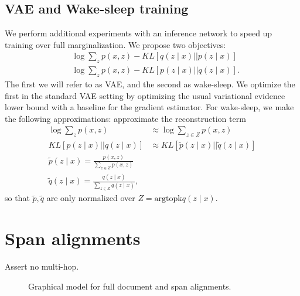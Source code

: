 \documentclass[11pt]{article}
\begin{document}
\subsection{VAE and Wake-sleep training}
We perform additional experiments with an inference network to speed up training
over full marginalization.
We propose two objectives:
\begin{align}
&\log\sum_z p(x,z) - KL[q(z\mid x) || p(z \mid x)]\\
&\log\sum_z p(x,z) - KL[p(z\mid x) || q(z \mid x)].
\end{align}
The first we will refer to as VAE, and the second as wake-sleep.
We optimize the first in the standard VAE setting by optimizing the usual variational evidence
lower bound with a baseline for the gradient estimator.
For wake-sleep, we make the following approximations:
approximate the reconstruction term
\begin{align*}
\log\sum_z p(x,z) &\approx \log\sum_{z\in Z} p(x,z)\\
KL[p(z\mid x) || q(z \mid x)] &\approx KL[\tilde{p}(z\mid x) || \tilde{q}(z \mid x)]\\
\tilde{p}(z\mid x) = \frac{p(x,z)}{\sum_{z \in Z} p(x,z)}\\
\tilde{q}(z\mid x) = \frac{q(z\mid x)}{\sum_{z \in Z} q(z\mid x)},
\end{align*}
so that $\tilde{p},\tilde{q}$ are only normalized over $Z = \text{argtopk} q(z\mid x)$.

\section{Span alignments}
Assert no multi-hop.

\begin{figure}[t]
\begin{center}
\end{center}
\caption{Graphical model for full document and span alignments.
}
\label{fig:pgm-sent}
\end{figure}
\end{document}

